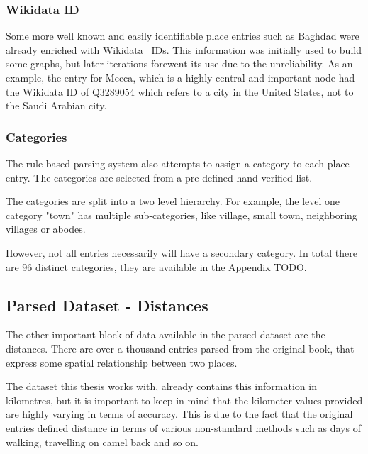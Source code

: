 \subsubsection{Wikidata ID}
Some more well known and easily identifiable place entries such as Baghdad were already enriched with Wikidata~\cite{Wikidata} IDs.
This information was initially used to build some graphs, but later iterations forewent its use due to the unreliability.
As an example, the entry for Mecca, which is a highly central and important node had the Wikidata ID of Q3289054
which refers to a city in the United States, not to the Saudi Arabian city.

\subsubsection{Categories}
The rule based parsing system also attempts to assign a category to each place entry.
The categories are selected from a pre-defined hand verified list.

The categories are split into a two level hierarchy.
For example, the level one category "town" has multiple sub-categories, like
village, small town, neighboring villages or abodes.

However, not all entries necessarily will have a secondary category.
In total there are 96 distinct categories, they are available in the Appendix TODO.

\subsection{Parsed Dataset - Distances}
The other important block of data available in the parsed dataset are the distances.
There are over a thousand entries parsed from the original book, that express some spatial relationship
between two places.

The dataset this thesis works with, already contains this information in kilometres, but it is important
to keep in mind that the kilometer values provided are highly varying in terms of accuracy. This
is due to the fact that the original entries defined distance in terms of various non-standard methods
such as days of walking, travelling on camel back and so on.


